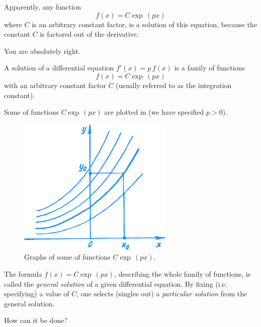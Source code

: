 \rdr Apparently, any function
\begin{equation*}%
 f (x) = C \exp \, (px)
\end{equation*}
where $C$ is an arbitrary constant factor, is a solution of this equation, because the constant $C$ is factored out of the derivative.

\athr You are absolutely right.
\begin{mytheo}{}
A solution of a differential equation $f' (x) = p \, f (x)$ is a family of functions
\begin{equation*}%
f(x)= C \exp \, (px)
\end{equation*}
with an arbitrary constant factor $C$ (usually referred to as the integration constant).
\end{mytheo}

Some of functions $C \exp \, (px)$ are plotted in  (we have specified $p > 0$).

\begin{figure}[!ht]%
\centering
\includegraphics[width=.6\textwidth]{figures/fig-55.pdf} 
\caption{Graphs of some of functions $C \exp \, (px)$.}
\label{fig-55}
\end{figure}


The formula $f (x) = C \exp \, (px)$, describing the whole family of functions, is called the \emph{general solution} of a given differential equation. By fixing (i.e. specifying) a value of $C$, one selects (singles out) a \emph{particular solution} from the general solution.

\rdr How can it be done?

